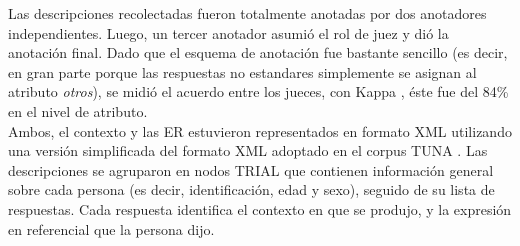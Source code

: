 



Las descripciones recolectadas fueron totalmente anotadas por dos anotadores independientes. Luego, un tercer anotador asumi\'o el rol de juez y di\'o la anotaci\'on final. Dado que el esquema de anotaci\'on fue bastante sencillo (es decir, en gran parte porque las respuestas no estandares simplemente se asignan al atributo {\em otros}), se midi\'o el acuerdo entre los jueces, con Kappa \cite{kappa}, \'este fue del 84\% en el nivel de atributo.\\

Ambos, el contexto y las ER estuvieron representados en formato XML utilizando una versi\'on simplificada del formato XML adoptado en el corpus TUNA \cite{tuna-corpus}. Las descripciones se agruparon en nodos TRIAL que contienen informaci\'on general sobre cada persona (es decir, identificaci\'on, edad y sexo), seguido de su lista de respuestas. Cada respuesta identifica el contexto en que se produjo, y la expresi\'on en referencial que la persona dijo.\\

